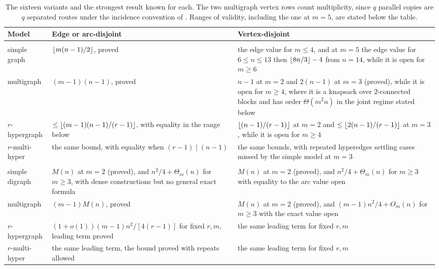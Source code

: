 \begin{table}[htbp]
\centering
\small
\renewcommand{\arraystretch}{1.3}
\setlength{\tabcolsep}{5pt}
\begin{tabularx}{\textwidth}{@{}>{\raggedright\arraybackslash}p{}>{\raggedright\arraybackslash}X>{\raggedright\arraybackslash}X@{}}
\toprule
Model & Edge or arc-disjoint & Vertex-disjoint \\
\midrule
\addlinespace[1pt]
\multicolumn{3}{@{}l}{\itshape Undirected} \\
\addlinespace[2pt]
simple graph
  & $\left\lfloor m(n-1)/2 \right\rfloor$, proved
  & the edge value for $m \le 4$, and at $m=5$ the edge value for $6 \le n \le 13$ then $\left\lfloor 8n/3 \right\rfloor-4$ from $n=14$, while it is open for $m \ge 6$ \\
multigraph
  & $(m-1)(n-1)$, proved
  & $n-1$ at $m=2$ and $2(n-1)$ at $m=3$ (proved), while it is open for
    $m \ge 4$, where it is a knapsack over $2$-connected blocks and has order
    $\Theta(m^2n)$ in the joint regime stated below \\
$r$-hypergraph
  & $\le \left\lfloor (m-1)(n-1)/(r-1) \right\rfloor$, with equality in the range below
  & $\left\lfloor (n-1)/(r-1) \right\rfloor$ at $m=2$ and $\le \left\lfloor 2(n-1)/(r-1) \right\rfloor$ at $m=3$, while it is open for $m \ge 4$ \\
$r$-multi-hyper
  & the same bound, with equality when \mbox{$(r-1) \mid (n-1)$}
  & the same bounds, with repeated hyperedges settling cases missed by the simple model at $m=3$ \\
\addlinespace[4pt]
\midrule
\addlinespace[1pt]
\multicolumn{3}{@{}l}{\itshape Directed} \\
\addlinespace[2pt]
simple digraph
  & $M(n)$ at $m=2$ (proved), and $n^2/4 + \Theta_m(n)$ for $m \ge 3$, with dense constructions but no general exact formula
  & $M(n)$ at $m=2$ (proved), and $n^2/4 + \Theta_m(n)$ for $m \ge 3$ with equality to the arc value open \\
multigraph
  & $(m-1)M(n)$, proved
  & $M(n)$ at $m=2$ (proved), and $(m-1)n^2/4 + O_m(n)$ for $m \ge 3$ with the
    exact value open \\
$r$-hypergraph
  & $(1+o(1))(m-1)n^2/[4(r-1)]$ for fixed $r, m$, leading term proved
  & the same leading term for fixed $r, m$ \\
$r$-multi-hyper
  & the same leading term, the bound proved with repeats allowed
  & the same leading term for fixed $r, m$ \\
\bottomrule
\end{tabularx}
\caption{The sixteen variants and the strongest result known for each. The two multigraph vertex rows count multiplicity, since $q$ parallel copies are $q$ separated routes under the incidence convention of . Ranges of validity, including the one at $m=5$, are stated below the table.}

\end{table}

